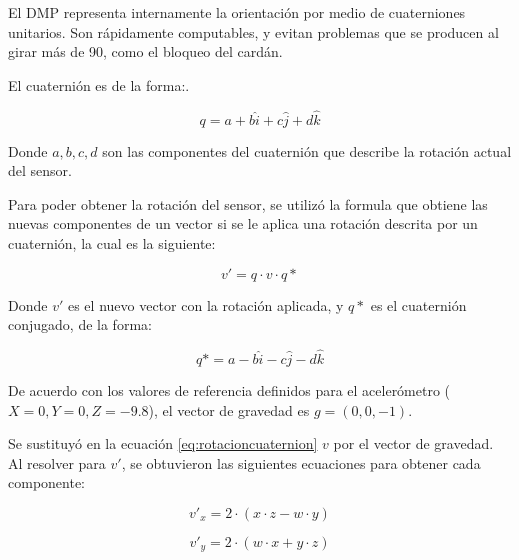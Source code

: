 
El DMP representa internamente la orientación por medio de cuaterniones unitarios. Son rápidamente computables, y evitan problemas que se producen al girar más de 90\degree, como el bloqueo del cardán.

El cuaternión es de la forma:.

\begin{equation}
	q = a + b\hat{i} + c\hat{j} + d\hat{k}
	\label{eq:eqcuaternion}
\end{equation}

Donde $a, b, c, d$ son las componentes del cuaternión que describe la rotación actual del sensor.

Para poder obtener la rotación del sensor, se utilizó la formula que obtiene las nuevas componentes de un vector si se le aplica una rotación descrita por un cuaternión, la cual es la siguiente:

\begin{equation}
	v' = q\cdot v\cdot q*
	\label{eq:rotacioncuaternion}
\end{equation}

Donde $v'$ es el nuevo vector con la rotación aplicada, y $q*$ es el cuaternión conjugado, de la forma:

\begin{equation}
	q* = a - b\hat{i} - c\hat{j} - d\hat{k}
	\label{eq:eqcuaternionconj}
\end{equation}

De acuerdo con los valores de referencia definidos para el acelerómetro ($X=0, Y=0, Z=-9.8$), el vector de gravedad es $g = (0, 0, -1)$.

Se sustituyó en la ecuación \ref{eq:rotacioncuaternion} $v$ por el vector de gravedad. Al resolver para $v'$, se obtuvieron las siguientes ecuaciones para obtener cada componente:

\begin{equation}
	v'_x = 2\cdot(x \cdot z - w \cdot y)
	\label{eq:componentex}
\end{equation}

\begin{equation}
	v'_y = 2\cdot(w \cdot x + y \cdot z)
	\label{eq:componentey}
\end{equation}

